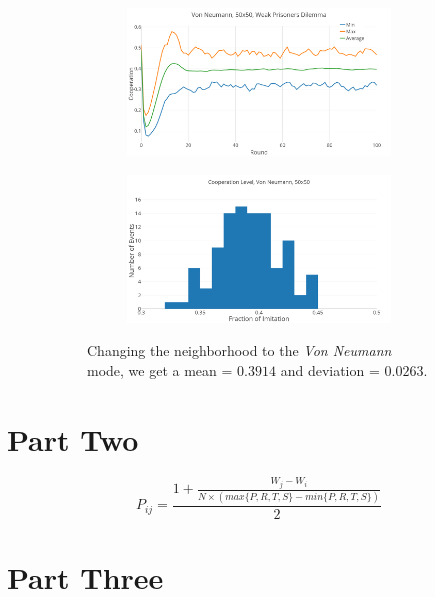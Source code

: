 \documentclass[a4paper, 11pt]{article}
\begin{document}
\begin{figure}[H]
\begin{subfigure}{.55\textwidth}
	\begin{subfigure}{1\textwidth}
		\includegraphics[width=1\linewidth]{PDVonNeumann50x50}
	\end{subfigure}

	\begin{subfigure}{1\textwidth}
		\includegraphics[width=1\linewidth]{PDVonNeumann50x50HG}
	\end{subfigure}
\end{subfigure}%
\begin{subfigure}{.45\textwidth}
	Changing the neighborhood to the \textit{Von Neumann} mode, we get a mean = $0.3914$ and deviation = $0.0263$.
\end{subfigure}

\end{figure}



\newpage
\section{Part Two}

\[ P_{ij} = \frac{1+ \frac{W_j-W_i}{N \times (max\{P,R,T,S\} - min\{P,R,T,S\})}}{2} \]

\newpage
\section{Part Three}
\end{document}
